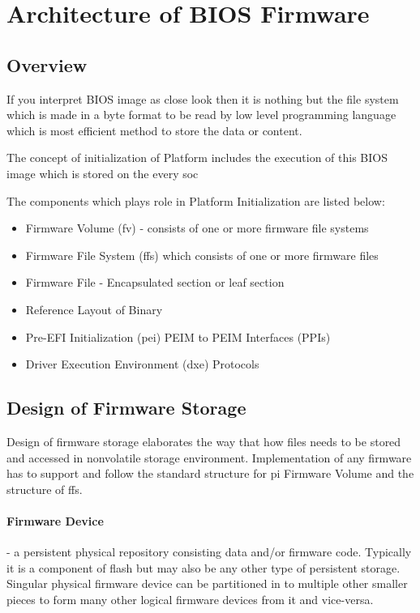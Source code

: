\section{Architecture of BIOS Firmware}\label{section-architecture}
\subsection{Overview}
If you interpret BIOS image as close look then it is nothing but the file system which is made in a byte format to be read by low level programming language which is most efficient method to store the data or content.

The concept of initialization of Platform includes the execution of this BIOS image which is stored on the every \gls{soc}

The components which plays role in Platform Initialization are listed below:
\begin{itemize}
	\item Firmware Volume (\gls{fv}) - consists of one or more firmware file systems
	\item Firmware File System (\gls{ffs}) which consists of one or more firmware files
	\item Firmware File - Encapsulated section or leaf section
	\item Reference Layout of Binary
	\item Pre-EFI Initialization (\gls{pei}) PEIM to PEIM Interfaces (PPIs)
	\item Driver Execution Environment (\gls{dxe}) Protocols
\end{itemize}

\subsection{Design of Firmware Storage}
Design of firmware storage elaborates the way that how files needs to be stored and accessed in nonvolatile storage environment. Implementation of any firmware has to support and follow the standard structure for \gls{pi} Firmware Volume and the structure of \gls{ffs}.

\paragraph{Firmware Device} - a persistent physical repository consisting data and/or firmware code. Typically it is a component of flash but may also be any other type of persistent storage. Singular physical firmware device can be partitioned in to multiple other smaller pieces to form many other logical firmware devices from it and vice-versa.


